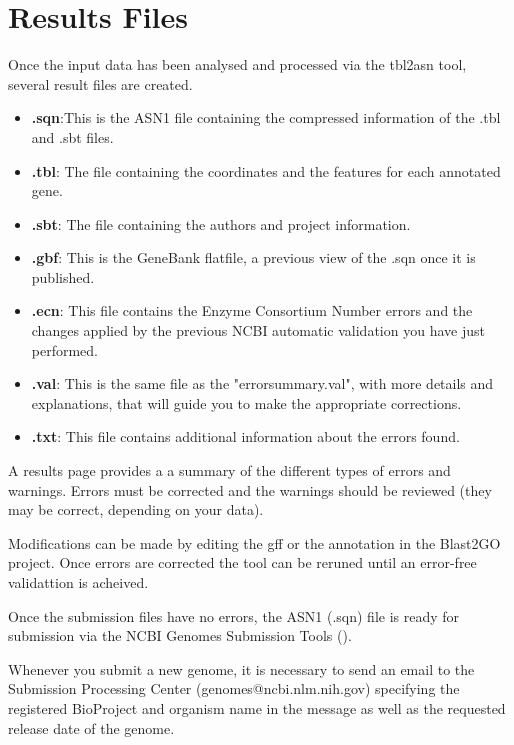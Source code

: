 \section{Results Files}
Once the input data has been analysed and processed via the tbl2asn tool, several
result files are created.
\begin{itemize}
  \item \textbf{.sqn}:This is the ASN1 file containing the compressed
information of the .tbl and .sbt files.

\item \textbf{.tbl}: The file containing the coordinates and the features
for each annotated gene.

\item \textbf{.sbt}: The file containing the authors and project
information.

  \item \textbf{.gbf}: This is the GeneBank flatfile, a previous view of the
  .sqn once it is published.

 \item \textbf{.ecn}: This file contains the Enzyme Consortium Number errors and
 the changes applied by the previous NCBI automatic validation you have just
 performed.

  \item \textbf{.val}: This is the same file as the "errorsummary.val", with
  more details and explanations, that will guide you to make the appropriate
  corrections.
   \item \textbf{.txt}: This file contains additional information about the
   errors found.
\end{itemize}

A results page provides a  a summary of the different types of errors and
warnings.
Errors must be corrected and the warnings should be reviewed (they may be
correct, depending on your data).

Modifications can be made by editing the gff or the annotation in the Blast2GO
project.
Once errors are corrected the tool can be reruned until an error-free
validattion is acheived.

Once the submission files have no errors, the ASN1 (.sqn) file is ready for submission via
the  NCBI Genomes Submission Tools
().

Whenever you submit a new genome, it is necessary to send an email to the Submission Processing Center
(genomes@ncbi.nlm.nih.gov) specifying the registered BioProject and organism
name in the message as well as the requested release date of the genome.


